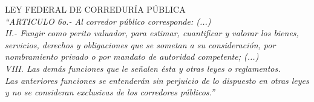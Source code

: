 \textcolor{principal}{LEY FEDERAL DE CORREDUR\'IA P\'UBLICA}\\[10pt]

\textit{``ARTICULO 6o.- Al corredor público corresponde: (...)}\\[10pt]

\textit{II.- Fungir como perito valuador, para estimar, cuantificar y valorar los bienes, servicios, derechos y obligaciones que se sometan a su consideraci\'on, por nombramiento privado o por mandato de autoridad competente; (...)}\\[10pt]

\textit{VIII. Las dem\'as funciones que le señalen \'esta y otras leyes o reglamentos.}\\[10pt]

\textit{Las anteriores funciones se entender\'an sin perjuicio de lo dispuesto en otras leyes y no se consideran exclusivas de los corredores p\'ublicos.'' }\\[10pt]

